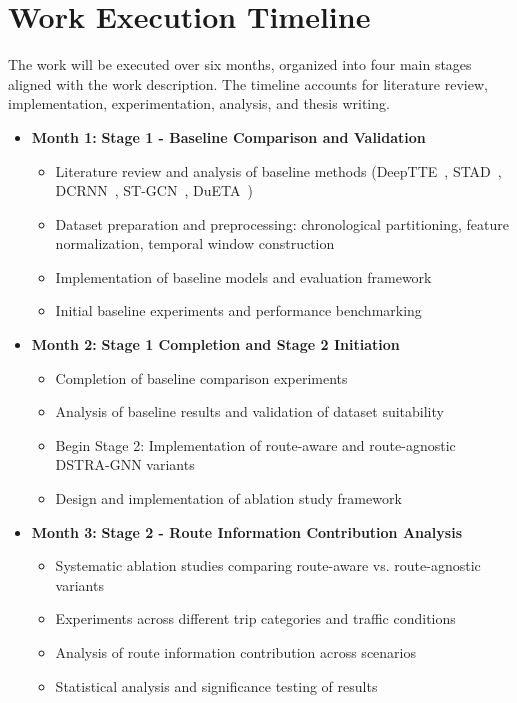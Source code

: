 \section{Work Execution Timeline}

The work will be executed over six months, organized into four main stages aligned with the work description. The timeline accounts for literature review, implementation, experimentation, analysis, and thesis writing.

\begin{itemize}[leftmargin=0pt]
    \item \textbf{Month 1:} \textbf{Stage 1 - Baseline Comparison and Validation}
    \begin{itemize}
        \item Literature review and analysis of baseline methods (DeepTTE~\cite{deepTTE2018}, STAD~\cite{abbar2020stad}, DCRNN~\cite{dcrnn2018}, ST-GCN~\cite{yu2018stgcn}, DuETA~\cite{dueta2023})
        \item Dataset preparation and preprocessing: chronological partitioning, feature normalization, temporal window construction
        \item Implementation of baseline models and evaluation framework
        \item Initial baseline experiments and performance benchmarking
    \end{itemize}
    
    \item \textbf{Month 2:} \textbf{Stage 1 Completion and Stage 2 Initiation}
    \begin{itemize}
        \item Completion of baseline comparison experiments
        \item Analysis of baseline results and validation of dataset suitability
        \item Begin Stage 2: Implementation of route-aware and route-agnostic DSTRA-GNN variants
        \item Design and implementation of ablation study framework
    \end{itemize}
    
    \item \textbf{Month 3:} \textbf{Stage 2 - Route Information Contribution Analysis}
    \begin{itemize}
        \item Systematic ablation studies comparing route-aware vs. route-agnostic variants
        \item Experiments across different trip categories and traffic conditions
        \item Analysis of route information contribution across scenarios
        \item Statistical analysis and significance testing of results
    \end{itemize}
    

\end{itemize}
